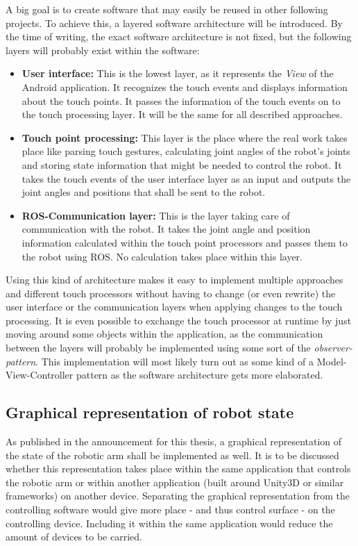 \documentclass[a4paper]{article}
\begin{document}
A big goal is to create software that may easily be reused in other following projects. To achieve this, a layered software architecture will be introduced. By the time of writing, the exact software architecture is not fixed, but the following layers will probably exist within the software:
\begin{itemize}
	\item \textbf{User interface:} This is the lowest layer, as it represents the \textit{View} of the Android application. It recognizes the touch events and displays information about the touch points. It passes the information of the touch events on to the touch processing layer. It will be the same for all described approaches.
	\item \textbf{Touch point processing:} This layer is the place where the real work takes place like parsing touch gestures, calculating joint angles of the robot's joints and storing state information that might be needed to control the robot. It takes the touch events of the user interface layer as an input and outputs the joint angles and positions that shall be sent to the robot.
	\item \textbf{ROS-Communication layer:} This is the layer taking care of communication with the robot. It takes the joint angle and position information calculated within the touch point processors and passes them to the robot using ROS. No calculation takes place within this layer.
\end{itemize}

Using this kind of architecture makes it easy to implement multiple approaches and different touch processors without having to change (or even rewrite) the user interface or the communication layers when applying changes to the touch processing. It is even possible to exchange the touch processor at runtime by just moving around some objects within the application, as the communication between the layers will probably be implemented using some sort of the \textit{observer-pattern}. This implementation will most likely turn out as some kind of a Model-View-Controller pattern as the software architecture gets more elaborated.

\subsection{Graphical representation of robot state}

As published in the announcement for this thesis, a graphical representation of the state of the robotic arm shall be implemented as well. It is to be discussed whether this representation takes place within the same application that controls the robotic arm or within another application (built around Unity3D or similar frameworks) on another device. Separating the graphical representation from the controlling software would give more place - and thus control surface - on the controlling device. Including it within the same application would reduce the amount of devices to be carried.
\end{document}

